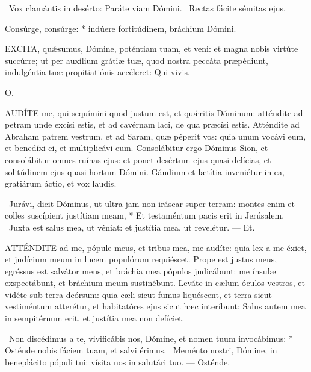 \V\ Vox clamántis in desérto: Paráte viam Dómini. \R\ Rectas fácite sémitas ejus.

 Consúrge, consúrge: * indúere fortitúdinem, bráchium Dómini.



\lettrine[lines=2]{E}{XCITA}, quǽsumus, Dómine, poténtiam tuam, et veni: et magna nobis virtúte succúrre; ut per auxílium grátiæ tuæ, quod nostra peccáta præpédiunt, indulgéntia tuæ propitiatiónis accéleret: Qui vivis.

 O. 

\sectionornament




\lettrine[lines=2]{A}{UDÍTE} me, qui sequímini quod justum est, et quǽritis Dóminum: atténdite ad petram unde excísi estis, et ad cavérnam laci, de qua præcísi estis. Atténdite ad Abraham patrem vestrum, et ad Saram, quæ péperit vos: quia unum vocávi eum, et benedíxi ei, et multiplicávi eum. Consolábitur ergo Dóminus Sion, et consolábitur omnes ruínas ejus: et ponet desértum ejus quasi delícias, et solitúdinem ejus quasi hortum Dómini. Gáudium et lætítia inveniétur in ea, gratiárum áctio, et vox laudis.

\R\ Jurávi, dicit Dóminus, ut ultra jam non iráscar super terram: montes enim et colles suscípient justítiam meam, * Et testaméntum pacis erit in Jerúsalem. \V\ Juxta est salus mea, ut véniat: et justítia mea, ut revelétur. --- Et.


\lettrine[lines=2]{A}{TTÉNDITE} ad me, pópule meus, et tribus mea, me audíte: quia lex a me éxiet, et judícium meum in lucem populórum requiéscet. Prope est justus meus, egréssus est salvátor meus, et bráchia mea pópulos judicábunt: me ínsulæ exspectábunt, et bráchium meum sustinébunt. Leváte in cælum óculos vestros, et vidéte sub terra deórsum: quia cæli sicut fumus liquéscent, et terra sicut vestiméntum atterétur, et habitatóres ejus sicut hæc interíbunt: Salus autem mea in sempitérnum erit, et justítia mea non defíciet.

\R\ Non discédimus a te, vivificábis nos, Dómine, et nomen tuum invocábimus: * Osténde nobis fáciem tuam, et salvi érimus. \V\ Meménto nostri, Dómine, in beneplácito pópuli tui: vísita nos in salutári tuo. --- Osténde.

